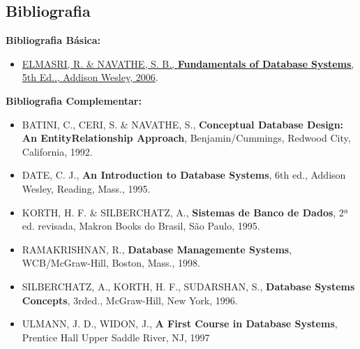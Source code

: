 \documentclass[12pt, a4paper]{article}
\begin{document}
\subsection{Bibliografia} \label{subsec:bibliografia}




\textbf{Bibliografia Básica:}

\begin{itemize}
    \item \href{https://people.vts.su.ac.rs/~peti/Baze\%20podataka/Literatura/Elmasri-Navathe-Fundamentals\%20of\%20DB\%20Systems-EbookDB.pdf}{ELMASRI, R. \& NAVATHE, S. B., \textbf{Fundamentals of Database Systems}, 5th Ed.., Addison Wesley, 2006}.
\end{itemize}

\textbf{Bibliografia Complementar:}

\begin{itemize}
    \item BATINI, C., CERI, S. \& NAVATHE, S., \textbf{Conceptual Database Design: An EntityRelationship Approach}, Benjamin/Cummings, Redwood City, California, 1992.
    \item DATE, C. J., \textbf{An Introduction to Database Systems}, 6th ed., Addison Wesley, Reading, Mass., 1995.
    \item KORTH, H. F. \& SILBERCHATZ, A., \textbf{Sistemas de Banco de Dados}, 2ª ed. revisada, Makron Books do Brasil, São Paulo, 1995.
    \item RAMAKRISHNAN, R., \textbf{Database Managemente Systems}, WCB/McGraw-Hill, Boston, Mass., 1998.
    \item SILBERCHATZ, A., KORTH, H. F., SUDARSHAN, S., \textbf{Database Systems Concepts}, 3rded., McGraw-Hill, New York, 1996.
    \item ULMANN, J. D., WIDON, J., \textbf{A First Course in Database Systems}, Prentice Hall Upper Saddle River, NJ, 1997
\end{itemize}
\end{document}
